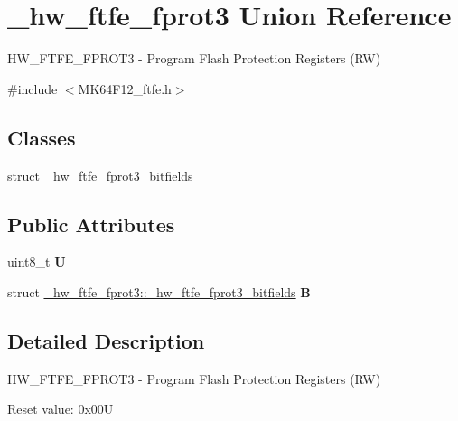 \hypertarget{union__hw__ftfe__fprot3}{}\section{\+\_\+hw\+\_\+ftfe\+\_\+fprot3 Union Reference}
\label{union__hw__ftfe__fprot3}


H\+W\+\_\+\+F\+T\+F\+E\+\_\+\+F\+P\+R\+O\+T3 -\/ Program Flash Protection Registers (RW)  




{\ttfamily \#include $<$M\+K64\+F12\+\_\+ftfe.\+h$>$}

\subsection*{Classes}
\begin{DoxyCompactItemize}
\item 
struct \hyperlink{struct__hw__ftfe__fprot3_1_1__hw__ftfe__fprot3__bitfields}{\+\_\+hw\+\_\+ftfe\+\_\+fprot3\+\_\+bitfields}
\end{DoxyCompactItemize}
\subsection*{Public Attributes}
\begin{DoxyCompactItemize}
\item 
uint8\+\_\+t {\bfseries U}\hypertarget{union__hw__ftfe__fprot3_adbe0a5f0d2039399acfe72da9006b00b}{}\label{union__hw__ftfe__fprot3_adbe0a5f0d2039399acfe72da9006b00b}

\item 
struct \hyperlink{struct__hw__ftfe__fprot3_1_1__hw__ftfe__fprot3__bitfields}{\+\_\+hw\+\_\+ftfe\+\_\+fprot3\+::\+\_\+hw\+\_\+ftfe\+\_\+fprot3\+\_\+bitfields} {\bfseries B}\hypertarget{union__hw__ftfe__fprot3_aad16d7096dc729be025f59db247a3e21}{}\label{union__hw__ftfe__fprot3_aad16d7096dc729be025f59db247a3e21}

\end{DoxyCompactItemize}


\subsection{Detailed Description}
H\+W\+\_\+\+F\+T\+F\+E\+\_\+\+F\+P\+R\+O\+T3 -\/ Program Flash Protection Registers (RW) 

Reset value\+: 0x00U

